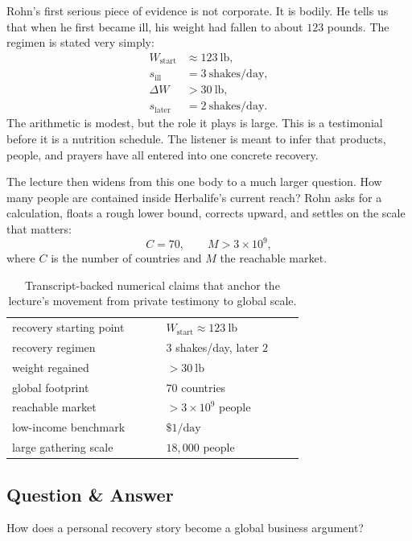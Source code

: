 Rohn's first serious piece of evidence is not corporate. It is bodily. He tells us that when he first became ill, his weight had fallen to about \(123\) pounds. The regimen is stated very simply:
\begin{align}
W_{\mathrm{start}} &\approx 123\ \text{lb},\\
s_{\mathrm{ill}} &= 3\ \text{shakes/day},\\
\Delta W &> 30\ \text{lb},\\
s_{\mathrm{later}} &= 2\ \text{shakes/day}.
\end{align}
The arithmetic is modest, but the role it plays is large. This is a testimonial before it is a nutrition schedule. The listener is meant to infer that products, people, and prayers have all entered into one concrete recovery.

The lecture then widens from this one body to a much larger question. How many people are contained inside Herbalife's current reach? Rohn asks for a calculation, floats a rough lower bound, corrects upward, and settles on the scale that matters:
\begin{equation}
C = 70, \qquad M > 3\times 10^9,
\end{equation}
where \(C\) is the number of countries and \(M\) the reachable market.

\begin{table}[h]
\centering
\begin{tabular}{p{0.38\linewidth} p{0.34\linewidth}}
recovery starting point & \(W_{\mathrm{start}} \approx 123\ \text{lb}\) \\
recovery regimen & \(3\) shakes/day, later \(2\) \\
weight regained & \(>30\ \text{lb}\) \\
global footprint & \(70\) countries \\
reachable market & \(>3\times 10^9\) people \\
low-income benchmark & \(\$1/\text{day}\) \\
large gathering scale & \(18{,}000\) people
\end{tabular}
\caption{Transcript-backed numerical claims that anchor the lecture's movement from private testimony to global scale.}
\end{table}

\subsection{Question \& Answer}

How does a personal recovery story become a global business argument?

